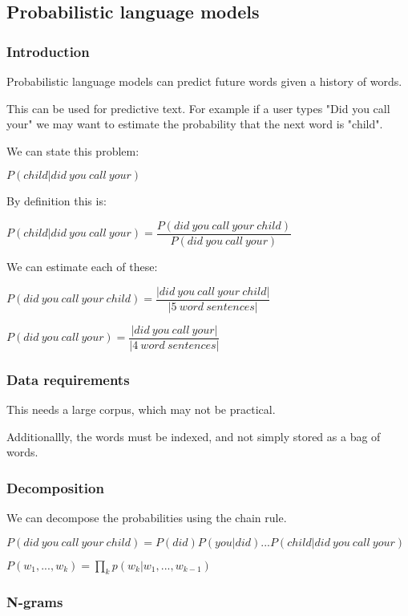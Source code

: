 
\subsection{Probabilistic language models}

\subsubsection{Introduction}

Probabilistic language models can predict future words given a history of words.

This can be used for predictive text. For example if a user types "Did you call your" we may want to estimate the probability that the next word is "child".

We can state this problem:

\(P(child|did\ you\ call\ your)\)

By definition this is:

\(P(child|did\ you\ call\ your)= \dfrac{P(did\ you\ call\ your\ child)}{P(did\ you\ call\ your)}\)

We can estimate each of these:

\(P(did\ you\ call\ your\ child)=\dfrac{|did\ you\ call\ your\ child|}{|5\ word\ sentences|}\)

\(P(did\ you\ call\ your)=\dfrac{|did\ you\ call\ your|}{|4\ word\ sentences|}\)

\subsubsection{Data requirements}

This needs a large corpus, which may not be practical.

Additionallly, the words must be indexed, and not simply stored as a bag of words.

\subsubsection{Decomposition}

We can decompose the probabilities using the chain rule.

\(P(did\ you\ call\ your\ child)=P(did)P(you|did)...P(child|did\ you\ call\ your)\)

\(P(w_1,...,w_k)= \prod_k p(w_k|w_1,...,w_{k-1})\)

\subsubsection{N-grams}

